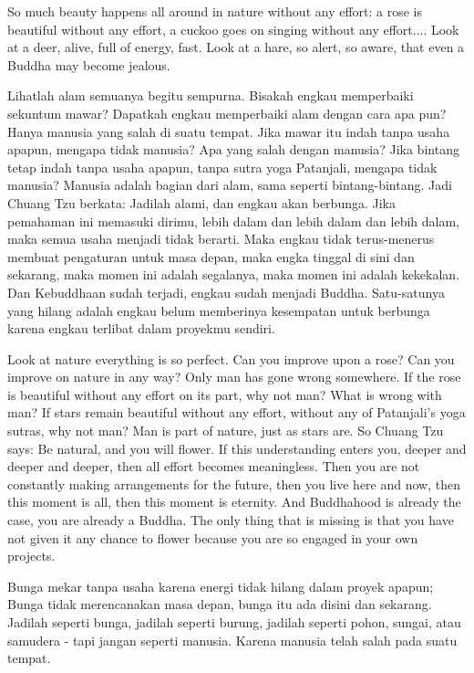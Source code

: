 \english
So much beauty happens all around in nature without any effort: a rose is beautiful without any effort, a cuckoo goes on singing without any effort.... Look at a deer, alive, full of energy, fast. Look at a hare, so alert, so aware, that even a Buddha may become jealous.

\bahasa
Lihatlah alam semuanya begitu sempurna. Bisakah engkau memperbaiki sekuntum mawar? Dapatkah engkau memperbaiki alam dengan cara apa pun? Hanya manusia yang salah di suatu tempat. Jika mawar itu indah tanpa usaha apapun, mengapa tidak manusia? Apa yang salah dengan manusia? Jika bintang tetap indah tanpa usaha apapun, tanpa sutra yoga Patanjali, mengapa tidak manusia? Manusia adalah bagian dari alam, sama seperti bintang-bintang. Jadi Chuang Tzu berkata: Jadilah alami, dan engkau akan berbunga. Jika pemahaman ini memasuki dirimu, lebih dalam dan lebih dalam dan lebih dalam, maka semua usaha menjadi tidak berarti. Maka engkau tidak terus-menerus membuat pengaturan untuk masa depan, maka engka tinggal di sini dan sekarang, maka momen ini adalah segalanya, maka momen ini adalah kekekalan. Dan Kebuddhaan sudah terjadi, engkau sudah menjadi Buddha. Satu-satunya yang hilang adalah engkau belum memberinya kesempatan untuk berbunga karena engkau terlibat dalam proyekmu sendiri.

\english
Look at nature everything is so perfect. Can you improve upon a rose? Can you improve on nature in any way? Only man has gone wrong somewhere. If the rose is beautiful without any effort on its part, why not man? What is wrong with man? If stars remain beautiful without any effort, without any of Patanjali's yoga sutras, why not man? Man is part of nature, just as stars are. So Chuang Tzu says: Be natural, and you will flower. If this understanding enters you, deeper and deeper and deeper, then all effort becomes meaningless. Then you are not constantly making arrangements for the future, then you live here and now, then this moment is all, then this moment is eternity. And Buddhahood is already the case, you are already a Buddha. The only thing that is missing is that you have not given it any chance to flower because you are so engaged in your own projects.

\bahasa
Bunga mekar tanpa usaha karena energi tidak hilang dalam proyek apapun; Bunga tidak merencanakan masa depan, bunga itu ada disini dan sekarang. Jadilah seperti bunga, jadilah seperti burung, jadilah seperti pohon, sungai, atau samudera - tapi jangan seperti manusia. Karena manusia telah salah pada suatu tempat.

